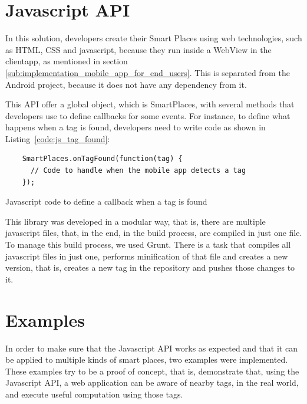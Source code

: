 \section{Javascript API}
\label{sec:javascript_api}
In this solution, developers create their Smart Places using web technologies, such as \gls{HTML}, \gls{CSS} and javascript, because they run inside a WebView in the clientapp, as mentioned in section \ref{sub:implementation_mobile_app_for_end_users}.
This is separated from the Android project, because it does not have any dependency from it.

This \gls{API} offer a global object, which is SmartPlaces, with several methods that developers use to define callbacks for some events. For instance, to define what happens when a tag is found, developers need to write code as shown in Listing~\ref{code:js_tag_found}:

\begin{listing}[H]
  \begin{verbatim}
    SmartPlaces.onTagFound(function(tag) {
      // Code to handle when the mobile app detects a tag
    });
  \end{verbatim}
  \caption[Tag found]{Javascript code to define a callback when a tag is found}
  \label{code:js_tag_found}
\end{listing}

This library was developed in a modular way, that is, there are multiple javascript files, that, in the end, in the build process, are compiled in just one file.
To manage this build process, we used Grunt. There is a task that compiles all javascript files in just one, performs minification of that file and creates a new version, that is, creates a new tag in the repository and pushes those changes to it.

\section{Examples}
\label{sec:implementation_examples}
In order to make sure that the Javascript \gls{API} works as expected and that it can be applied to multiple kinds of smart places, two examples were implemented.
These examples try to be a proof of concept, that is, demonstrate that, using the Javascript API, a web application can be aware of nearby tags, in the real world, and execute useful computation using those tags.

